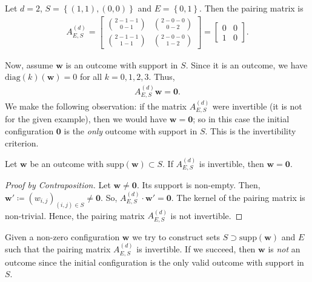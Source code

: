 \begin{example}
    Let \( d = 2 \), \( S = \left\{ (1,1), (0,0) \right\} \) and \( E = \left\{ 0,1 \right\} \). Then the pairing matrix is
    \begin{align*}
        A^{(d)}_{E,S}  = \begin{bmatrix}
            \binom{2-1-1}{0-1} & \binom{2-0-0}{0-2} \\
            \binom{2-1-1}{1-1}  & \binom{2-0-0}{1-2}
        \end{bmatrix} = \begin{bmatrix}
            0 & 0 \\
            1 & 0
        \end{bmatrix}.
    \end{align*}

    Now, assume \( \mathbf{w} \) is an outcome with support in \( S \). Since it is an outcome, we have \( \mathrm{diag}(k)(\mathbf{w}) = 0 \) for all \( k = 0, 1,2,3 \). Thus, 
    \begin{align*}
        A^{(d)}_{E,S} \mathbf w = \mathbf 0.
    \end{align*}
    We make the following observation: if the matrix \( A^{(d)}_{E,S} \) were invertible (it is not for the given example), then we would have \( \mathbf w = \mathbf 0 \); so in this case the initial configuration \( \mathbf{0} \) is the \emph{only} outcome with support in \( S \). This is the invertibility criterion. 
\end{example}

\begin{proposition}
    Let \( \mathbf{w} \) be an outcome with \( \mathrm{supp}(\mathbf w) \subset S \).
    If \( A^{(d)}_{E,S} \) is invertible, then \( \mathbf{w} = \mathbf 0 \).
\end{proposition}

\begin{proof}[Proof by Contraposition]
    Let \( \mathbf{w} \neq \mathbf 0 \). Its support is non-empty. Then, \( \mathbf w' \coloneqq (w_{i,j})_{(i,j) \in S} \neq \mathbf 0 \). So, \( A^{(d)}_{E,S} \cdot \mathbf w' = \mathbf 0 \). The kernel of the pairing matrix is non-trivial. Hence, the pairing matrix \( A^{(d)}_{E,S} \) is not invertible.
\end{proof}

Given a non-zero configuration \( \mathbf{w} \) we try to construct sets \( S \supset \mathrm{supp}(\mathbf w) \) and \( E \) such that the pairing matrix \( A_{E,S}^{(d)} \) is invertible. If we succeed, then \( \mathbf{w} \) is \emph{not} an outcome since the initial configuration is the only valid outcome with support in \( S \). 


